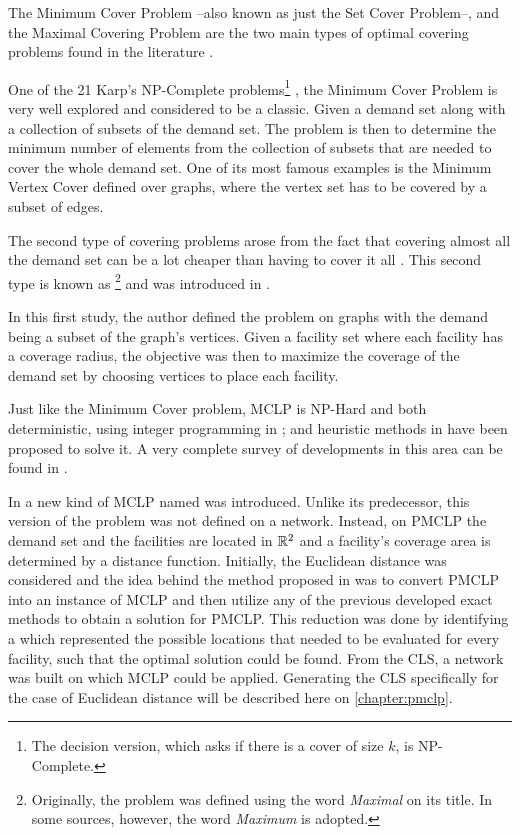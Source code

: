 The Minimum Cover Problem --also known as just the Set Cover Problem--, and the Maximal Covering Problem are the two main types of optimal covering problems found in the literature \cite{karatas}. 

One of the 21 Karp's NP-Complete problems\footnote{The decision version, which asks if there is a cover of size $k$, is NP-Complete.} \cite{karp}, the Minimum Cover Problem is very well explored and considered to be a classic. 
Given a demand set along with a collection of subsets of the demand set. The problem is then to determine the minimum number of elements from the collection of subsets that are needed to cover the whole demand set. One of its most famous examples is the Minimum Vertex Cover defined over graphs, where the vertex set has to be covered by a subset of edges.

The second type of covering problems arose from the fact that covering almost all the demand set can be a lot cheaper than having to cover it all \cite{garcia}. This second type is known as \footnote{Originally, the problem was defined using the word \textit{Maximal} on its title. In some sources, however, the word \textit{Maximum} is adopted.} and was introduced in .

In this first study, the author defined the problem on graphs with the demand being a subset of the graph's vertices. Given a facility set where each facility has a coverage radius, the objective was then to maximize the coverage of the demand set by choosing vertices to place each facility.

Just like the Minimum Cover problem, MCLP is NP-Hard \cite{hatta:2013} and both deterministic, using integer programming in ; and heuristic methods in  have been proposed to solve it. A very complete survey of developments in this area can be found in .

In  a new kind of MCLP named  was introduced. Unlike its predecessor, this version of the problem was not defined on a network. Instead, on PMCLP the demand set and the facilities are located in $\mathbb{R}^2$ and a facility's coverage area is determined by a distance function. 
Initially, the Euclidean distance was considered and the idea behind the method proposed in  was to convert PMCLP into an instance of MCLP and then utilize any of the previous developed exact methods to obtain a solution for PMCLP. This reduction was done by identifying a  which represented the possible locations that needed to be evaluated for every facility, such that the optimal solution could be found. From the CLS, a network was built on which MCLP could be applied. Generating the CLS specifically for the case of Euclidean distance will be described here on \autoref{chapter:pmclp}.

